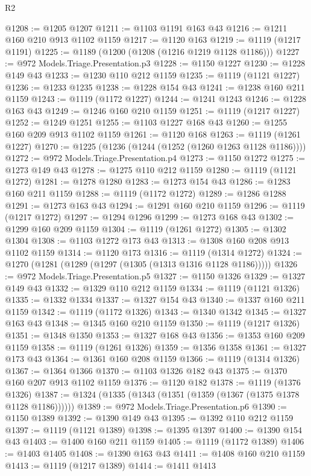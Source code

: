 \begin{lexlean}{R2}
\begin{coremodule}
@1208 := @1205 @1207
@1211 := @1103 @1191 @163 @43
@1216 := @1211 @160 @210 @913 @1102 @1159
@1217 := @1120 @163
@1219 := @1119 (@1217 @1191)
@1225 := @1189 (@1200 (@1208 (@1216 @1219 @1128 @1186)))
@1227 := @972 Models.Triage.Presentation.p3
@1228 := @1150 @1227
@1230 := @1228 @149 @43
@1233 := @1230 @110 @212 @1159
@1235 := @1119 (@1121 @1227)
@1236 := @1233 @1235
@1238 := @1228 @154 @43
@1241 := @1238 @160 @211 @1159
@1243 := @1119 (@1172 @1227)
@1244 := @1241 @1243
@1246 := @1228 @163 @43
@1249 := @1246 @160 @210 @1159
@1251 := @1119 (@1217 @1227)
@1252 := @1249 @1251
@1255 := @1103 @1227 @168 @43
@1260 := @1255 @160 @209 @913 @1102 @1159
@1261 := @1120 @168
@1263 := @1119 (@1261 @1227)
@1270 := @1225 (@1236 (@1244 (@1252 (@1260 @1263 @1128 @1186))))
@1272 := @972 Models.Triage.Presentation.p4
@1273 := @1150 @1272
@1275 := @1273 @149 @43
@1278 := @1275 @110 @212 @1159
@1280 := @1119 (@1121 @1272)
@1281 := @1278 @1280
@1283 := @1273 @154 @43
@1286 := @1283 @160 @211 @1159
@1288 := @1119 (@1172 @1272)
@1289 := @1286 @1288
@1291 := @1273 @163 @43
@1294 := @1291 @160 @210 @1159
@1296 := @1119 (@1217 @1272)
@1297 := @1294 @1296
@1299 := @1273 @168 @43
@1302 := @1299 @160 @209 @1159
@1304 := @1119 (@1261 @1272)
@1305 := @1302 @1304
@1308 := @1103 @1272 @173 @43
@1313 := @1308 @160 @208 @913 @1102 @1159
@1314 := @1120 @173
@1316 := @1119 (@1314 @1272)
@1324 := @1270 (@1281 (@1289 (@1297 (@1305 (@1313 @1316 @1128 @1186)))))
@1326 := @972 Models.Triage.Presentation.p5
@1327 := @1150 @1326
@1329 := @1327 @149 @43
@1332 := @1329 @110 @212 @1159
@1334 := @1119 (@1121 @1326)
@1335 := @1332 @1334
@1337 := @1327 @154 @43
@1340 := @1337 @160 @211 @1159
@1342 := @1119 (@1172 @1326)
@1343 := @1340 @1342
@1345 := @1327 @163 @43
@1348 := @1345 @160 @210 @1159
@1350 := @1119 (@1217 @1326)
@1351 := @1348 @1350
@1353 := @1327 @168 @43
@1356 := @1353 @160 @209 @1159
@1358 := @1119 (@1261 @1326)
@1359 := @1356 @1358
@1361 := @1327 @173 @43
@1364 := @1361 @160 @208 @1159
@1366 := @1119 (@1314 @1326)
@1367 := @1364 @1366
@1370 := @1103 @1326 @182 @43
@1375 := @1370 @160 @207 @913 @1102 @1159
@1376 := @1120 @182
@1378 := @1119 (@1376 @1326)
@1387 := @1324 (@1335 (@1343 (@1351 (@1359 (@1367 (@1375 @1378 @1128 @1186))))))
@1389 := @972 Models.Triage.Presentation.p6
@1390 := @1150 @1389
@1392 := @1390 @149 @43
@1395 := @1392 @110 @212 @1159
@1397 := @1119 (@1121 @1389)
@1398 := @1395 @1397
@1400 := @1390 @154 @43
@1403 := @1400 @160 @211 @1159
@1405 := @1119 (@1172 @1389)
@1406 := @1403 @1405
@1408 := @1390 @163 @43
@1411 := @1408 @160 @210 @1159
@1413 := @1119 (@1217 @1389)
@1414 := @1411 @1413

\end{coremodule}
\end{lexlean}
